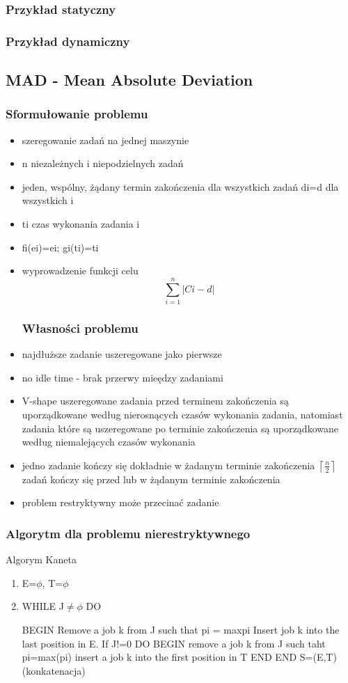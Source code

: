 \documentclass[12pt,a4paper]{article}
\begin{document}
\subsubsection{Przykład statyczny}
\subsubsection{Przykład dynamiczny}
\subsection{MAD - Mean Absolute Deviation}
\subsubsection{Sformułowanie problemu}
\begin{itemize}
\item szeregowanie zadań na jednej maszynie
\item n niezależnych i niepodzielnych zadań
\item jeden, wspólny, żądany termin zakończenia dla wszystkich zadań di=d dla wszystkich i
\item ti czas wykonania zadania i
\item fi(ei)=ei; gi(ti)=ti
\item wyprowadzenie funkcji celu
\begin{equation}
\sum\limits_{i=1}^{n}\left | Ci-d \right |
\end{equation}
\subsubsection{Własności problemu}
\item najdłuższe zadanie uszeregowane jako pierwsze
\item no idle time - brak przerwy mieędzy zadaniami
\item V-shape uszeregowane zadania przed terminem zakończenia są uporządkowane według nierosnących czasów wykonania zadania, natomiast zadania które są uszeregowane po terminie zakończenia są uporządkowane według niemalejących czasów wykonania
\item jedno zadanie kończy się dokładnie w żadanym terminie zakończenia $\left \lceil \frac{n}{2} \right \rceil$ zadań kończy się przed lub w żądanym terminie zakończenia
\item problem restryktywny może przecinać zadanie
\end{itemize}
\subsubsection{Algorytm dla problemu nierestryktywnego}
Algorym Kaneta
\begin{enumerate}
\item E=$\phi$, T=$\phi$
\item WHILE J$\neq \phi$ DO

BEGIN
Remove a job k from J such that pi = max{pi}
Insert job k into the last position in E.
If J!=0 DO
BEGIN remove a job k from J such taht pi=max(pi)
insert a job k into the first position in T
END
END
S=(E,T) (konkatenacja)
\end{enumerate}
\end{document}
